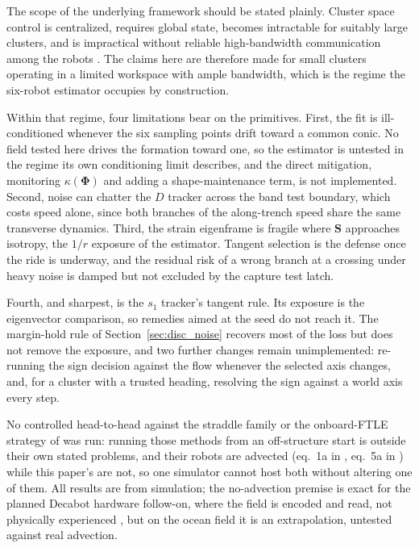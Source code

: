 \documentclass[lettersize,journal]{IEEEtran}
\begin{document}
The scope of the underlying framework should be stated plainly. Cluster
space control is centralized, requires global state, becomes intractable
for suitably large clusters, and is impractical without reliable
high-bandwidth communication among the robots \cite{31}. The claims here
are therefore made for small clusters operating in a limited workspace
with ample bandwidth, which is the regime the six-robot estimator
occupies by construction.

Within that regime, four limitations bear on the primitives. First, the
fit is ill-conditioned whenever the six sampling points drift toward a
common conic. No field tested here drives the formation toward one, so
the estimator is untested in the regime its own conditioning limit
describes, and the direct mitigation, monitoring
$\kappa(\boldsymbol{\Phi})$ and adding a shape-maintenance term, is not
implemented.
Second, noise can chatter the $D$ tracker across the band test
boundary, which costs speed alone, since both branches of the
along-trench speed share the same transverse dynamics. Third, the
strain eigenframe is fragile where $\mathbf{S}$ approaches isotropy,
the $1/r$ exposure of the estimator. Tangent selection is the defense once the ride is
underway, and the residual risk of a wrong branch at a crossing under
heavy noise is damped but not excluded by the capture test latch.

Fourth, and sharpest, is the $s_1$ tracker's tangent rule. Its exposure
is the eigenvector comparison, so remedies aimed at
the seed do not reach it. The margin-hold rule of
Section~\ref{sec:disc_noise} recovers most of the loss but does not
remove the exposure, and two further changes remain unimplemented:
re-running the sign decision against the flow whenever the selected axis
changes, and, for a cluster with a trusted heading, resolving the sign
against a world axis every step.

No controlled head-to-head against the straddle family \cite{26,27,28} or
the onboard-FTLE strategy of \cite{30} was run: running those methods
from an off-structure start is outside their own stated problems, and
their robots are advected (eq.~1a in \cite{26}, eq.~5a in \cite{30})
while this paper's are not, so one simulator cannot host both without
altering one of them. All
results are from simulation; the no-advection premise is exact for the
planned Decabot hardware follow-on, where the field is encoded and read,
not physically experienced \cite{34}, but on the ocean field it
is an extrapolation, untested against real advection.
\end{document}
